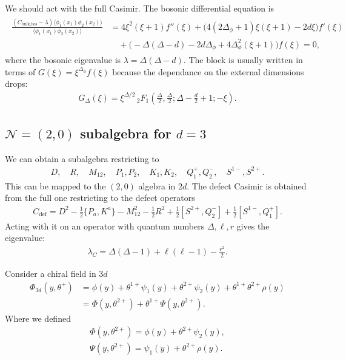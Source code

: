 \documentclass[letterpaper]{article}
\let\Oldsubsection\subsection
\renewcommand{\subsection}{\FloatBarrier\Oldsubsection}
\def\Nm{{\mathcal{N}}}
\begin{document}
We should act with the full Casimir. 
The bosonic differential equation is
\begin{align}
\begin{split}
 \frac{
 \left( C_{\text{bulk,bos}} - \lambda \right) \langle \phi_1(x_1) \phi_2(x_2)\rangle
 }{\langle \phi_1(x_1) \phi_2(x_2)\rangle}
 & = 4 \xi ^2 (\xi +1) f''(\xi )
   + \big( 4 (2 \Delta_\phi+1) \xi  (\xi +1) - 2 d \xi \big) f'(\xi ) \\
 & \quad 
   +  \big(-\Delta(\Delta -d)-2 d \Delta_\phi+4 \Delta_\phi^2 (\xi +1)\big) f(\xi )
   = 0,
\end{split}
\end{align}
where the bosonic eigenvalue is $\lambda = \Delta(\Delta - d)$.
The block is usually written in terms of $G(\xi) = \xi^{\Delta_\phi} f(\xi)$ because the dependance on the external dimensions drops:
\begin{align}
 G_\Delta(\xi)
 = \xi ^{\Delta /2} \, _2F_1\left(
    \frac{\Delta}{2},
    \frac{\Delta}{2};
    \Delta -\frac{d}{2} + 1;
    -\xi 
 \right).
\end{align}


\subsection{\texorpdfstring{$\Nm = (2, 0)$}{N=(2,0)} subalgebra 
for \texorpdfstring{$d = 3$}{d=3}}

We can obtain a subalgebra restricting to
\begin{align}
 D, \quad
 R, \quad
 M_{12}, \quad
 P_1, P_2, \quad
 K_1, K_2, \quad
 Q^+_1, Q^-_2, \quad
 S^{1-}, S^{2+}.
\end{align}
This can be mapped to the $(2,0)$ algebra in $2d$.
The defect Casimir is obtained from the full one restricting to the defect operators
\begin{align}
 C_{\text{def}} = 
    D^2
  - \frac12 \{ P_{a}, K^{a} \}
  - M_{12}^2
  - \frac12 R^2
  + \frac12 [ S^{2+}, Q^-_2]
  + \frac12 [ S^{1-}, Q^+_1].
\end{align}
Acting with it on an operator with quantum numbers $\Delta, \ell, r$ gives the eigenvalue:
\begin{align}
 \lambda_C 
 = \Delta (\Delta - 1)
 + \ell(\ell - 1)
 - \frac{r^2}{2}.
\end{align}

Consider a chiral field in $3d$
\begin{align}
  \Phi_{3d}(y, \theta^+) 
& = \phi(y) 
  + \theta^{1+} \psi_1(y)
  + \theta^{2+} \psi_2(y)
  + \theta^{1+} \theta^{2+} \rho(y) \\
& = \Phi(y, \theta^{2+}) 
  + \theta^{1+} \Psi(y, \theta^{2+}).
\end{align}
Where we defined
\begin{align}
 \Phi(y, \theta^{2+}) 
 = \phi(y) + \theta^{2+} \psi_2(y), \\
 \Psi(y, \theta^{2+})
 = \psi_1(y) + \theta^{2+} \rho(y).
\end{align}
\end{document}
